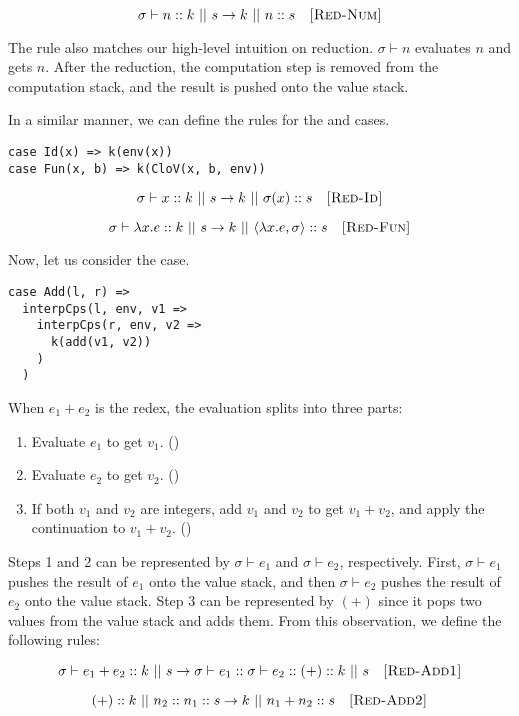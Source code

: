 \[
  \evalkd{n}k\ ||\ s\rightarrow k\ ||\ \conss{n}s
  \quad\textsc{[Red-Num]}
\]

The rule also matches our high-level intuition on reduction.
$\sigma\vdash n$ evaluates $n$ and gets $n$. After the reduction, the
computation step is removed from the computation stack, and the result is pushed
onto the value stack.

In a similar manner, we can define the rules for the  and 
cases.

\begin{verbatim}
case Id(x) => k(env(x))
case Fun(x, b) => k(CloV(x, b, env))
\end{verbatim}

\[
  \evalkd{x}k\ ||\ s\rightarrow k\ ||\ \conss{\sigma(x)}s
  \quad\textsc{[Red-Id]}
\]

\[
  \sigma\vdash\lambda x.e::k\ ||\ s\rightarrow k\ ||\ \langle\lambda x.e,\sigma\rangle::s
  \quad\textsc{[Red-Fun]}
\]

Now, let us consider the  case.

\begin{verbatim}
case Add(l, r) =>
  interpCps(l, env, v1 =>
    interpCps(r, env, v2 =>
      k(add(v1, v2))
    )
  )
\end{verbatim}

When $e_1+e_2$ is the redex, the evaluation splits into three parts:
\begin{enumerate}
  \item Evaluate $e_1$ to get $v_1$. ()
  \item Evaluate $e_2$ to get $v_2$. ()
  \item If both $v_1$ and $v_2$ are integers, add $v_1$ and $v_2$ to get $v_1+v_2$,
    and apply the continuation to $v_1+v_2$. ()
\end{enumerate}
Steps 1 and 2 can be represented by $\sigma\vdash e_1$ and $\sigma\vdash e_2$,
respectively. First, $\sigma\vdash e_1$ pushes the result of $e_1$ onto the value
stack, and then $\sigma\vdash e_2$ pushes the result of $e_2$ onto the value
stack. Step 3 can be represented by $(+)$ since it pops two values from the
value stack and adds them.
From this observation, we define the following rules:

\[
  \sigma\vdash e_1+e_2::k\ ||\ s\rightarrow \sigma\vdash e_1::\sigma\vdash e_2::(+):: k\ ||\ s
  \quad\textsc{[Red-Add1]}
\]

\[
  \addk k\ ||\ \conss{n_2}\conss{n_1}s\rightarrow k\ ||\ \conss{n_1+n_2}s
  \quad\textsc{[Red-Add2]}
\]

